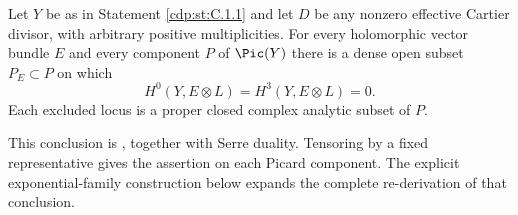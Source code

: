 
\begin{proposition}\label{cdp:st:C.1.2}
Let $Y$ be as in Statement \ref{cdp:st:C.1.1} and let $D$ be any nonzero effective
Cartier divisor, with arbitrary positive multiplicities. For every
holomorphic vector bundle $E$ and every component $P$ of $\Pic(Y)$ there
is a dense open subset $P_E\subset P$ on which
\[
 H^0(Y,E\otimes L)=H^3(Y,E\otimes L)=0.
\]
Each excluded locus is a proper closed complex analytic subset of $P$.
\end{proposition}

This conclusion is \citet[Corollary~1.3]{CDP98}, together with Serre duality. Tensoring by a fixed representative gives the assertion on each Picard component. The explicit exponential-family construction below expands the complete re-derivation of that conclusion.

